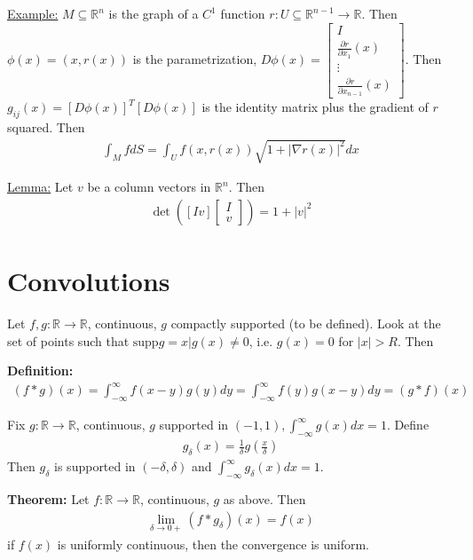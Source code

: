 \documentclass{article}
\newcommand*{\rr}{\mathbb{R}}%
\newcommand*{\partials}[2]{\frac{\partial #1}{\partial #2}}%
\begin{document}
\underline{Example:} $M\subseteq \rr^n$ is the graph of a $C^1$ function $r:U\subseteq\rr^{n-1}\to \rr$. Then $\phi(x)=(x,r(x))$ is the parametrization, $D\phi(x)=\begin{bmatrix}
    I\\
    \partials{r}{x_1}(x)\\
    \vdots\\
    \partials{r}{x_{n-1}}(x)
\end{bmatrix}$. Then $g_{ij}(x)=[D\phi(x)]^T[D\phi(x)]$ is the identity matrix plus the gradient of $r$ squared. Then \begin{align*}
    \int_M f dS = \int_U f(x,r(x))\sqrt{1+|\nabla r(x)|^2}dx
\end{align*}

\underline{Lemma:} Let $v$ be a column vectors in $\rr^n$. Then \begin{align*}
    \det([I v]\begin{bmatrix}
        I\\v
    \end{bmatrix})=1+|v|^2
\end{align*}

\section{Convolutions}

Let $f,g:\rr\to\rr$, continuous, $g$ compactly supported (to be defined). Look at the set of points such that $\text{supp} g = {x|g(x)\neq 0}$, i.e. $g(x)=0$ for $|x|>R$. Then 

\textbf{Definition:} \begin{align*}
    (f*g)(x)=\int_{-\infty}^{\infty}f(x-y)g(y)dy=\int_{-\infty}^{\infty}f(y)g(x-y)dy=(g*f)(x)
\end{align*}

Fix $g:\rr\to \rr$, continuous, $g$ supported in $(-1,1), \int_{-\infty}^{\infty}g(x)dx=1$. Define \begin{align*}
    g_\delta(x)=\frac{1}{\delta}g(\frac{x}{\delta})
\end{align*}Then $g_\delta$ is supported in $(-\delta,\delta)$ and $\int_{-\infty}^{\infty}g_\delta(x)dx=1$.

\textbf{Theorem:} Let $f:\rr\to\rr$, continuous, $g$ as above. Then \begin{align*}
    \lim_{\delta\to 0+}(f*g_\delta)(x)=f(x)
\end{align*}if $f(x)$ is uniformly continuous, then the convergence is uniform. 
\end{document}
